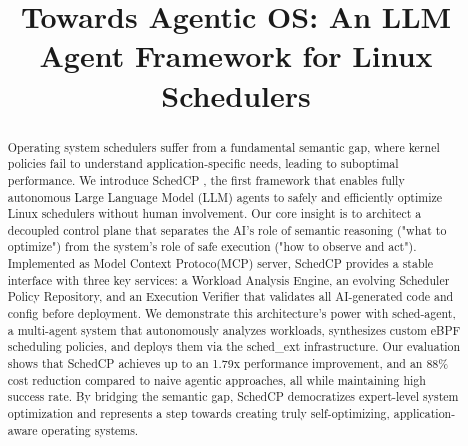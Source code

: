 \documentclass[sigplan,anonymous,10pt]{acmart}
\newcommand{\sys}{SchedCP }
\newcommand{\agent}{sched-agent}
\begin{document}
\title{Towards Agentic OS: An LLM Agent Framework for Linux Schedulers}



\begin{abstract}
Operating system schedulers suffer from a fundamental semantic gap, where kernel policies fail to understand application-specific needs, leading to suboptimal performance. We introduce \sys, the first framework that enables fully autonomous Large Language Model (LLM) agents to safely and efficiently optimize Linux schedulers without human involvement. Our core insight is to architect a decoupled control plane that separates the AI's role of semantic reasoning ("what to optimize") from the system's role of safe execution ("how to observe and act"). Implemented as Model Context Protoco(MCP) server, \sys provides a stable interface with three key services: a Workload Analysis Engine, an evolving Scheduler Policy Repository, and an Execution Verifier that validates all AI-generated code and config before deployment. We demonstrate this architecture's power with \agent, a multi-agent system that autonomously analyzes workloads, synthesizes custom eBPF scheduling policies, and deploys them via the sched\_ext infrastructure. Our evaluation shows that SchedCP achieves up to an 1.79x performance improvement, and an 88\% cost reduction compared to naive agentic approaches, all while maintaining high success rate. By bridging the semantic gap, SchedCP democratizes expert-level system optimization and represents a step towards creating truly self-optimizing, application-aware operating systems.
\end{abstract}
\end{document}

